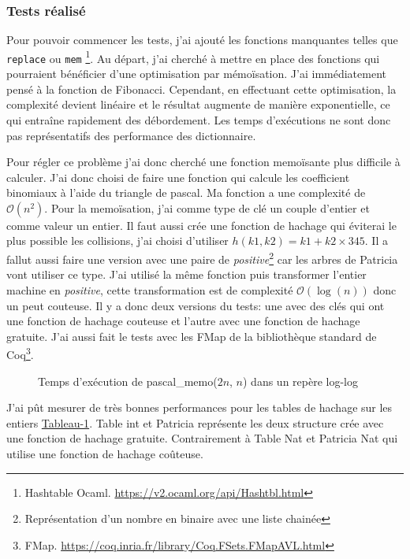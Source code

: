 \documentclass{article}
\begin{document}
      \subsubsection{Tests réalisé}

  Pour pouvoir commencer les tests, j'ai ajouté les fonctions manquantes
telles que \texttt{replace} ou \texttt{mem} \footnote{Hashtable Ocaml.
\url{https://v2.ocaml.org/api/Hashtbl.html}}.
Au départ, j'ai cherché à mettre en place des fonctions qui pourraient
bénéficier d'une optimisation par mémoïsation. J'ai immédiatement pensé à la
fonction de Fibonacci. Cependant, en effectuant cette optimisation, la
complexité devient linéaire et le résultat augmente de manière exponentielle,
ce qui entraîne rapidement des débordement. Les temps d'exécutions ne sont donc
pas représentatifs des performance des dictionnaire.

  Pour régler ce problème j'ai donc cherché une fonction memoïsante plus
difficile à calculer. J'ai donc choisi de faire une fonction qui calcule
les coefficient binomiaux à l'aide du triangle de pascal. Ma fonction a
une complexité de $\mathcal{O}(n^2)$. Pour la memoïsation, j'ai comme type
de clé un couple d'entier et comme valeur un entier. Il faut aussi crée une
fonction de hachage qui éviterai le plus possible les collisions, j'ai
choisi d'utiliser $h(k1, k2)= k1 + k2 \times 345$. Il a fallut aussi faire une
version avec une paire de \textit{positive}\footnote{Représentation d'un nombre
en binaire avec une liste chainée} car les arbres de Patricia vont utiliser ce
type. J'ai utilisé la même fonction puis transformer l'entier
machine en \textit{positive}, cette transformation est de complexité
$\mathcal{O}(\log(n))$ donc un peut couteuse. Il y a donc deux versions du
tests: une avec des clés qui ont une fonction de hachage couteuse et l'autre
avec une fonction de hachage gratuite. J'ai aussi fait le tests avec les
FMap de la bibliothèque standard de Coq\footnote{FMap.
\url{https://coq.inria.fr/library/Coq.FSets.FMapAVL.html}}.

\begin{figure}[ht]
  \centering
  
  \caption{Temps d'exécution de pascal\_memo($2n$, $n$) dans un repère log-log}
  \label{fig:pascal}
\end{figure}

J'ai pût mesurer de très bonnes performances pour les tables de hachage
sur les entiers \hyperref[fig:pascal]{Tableau-1}. Table int et Patricia
représente les deux structure crée avec une fonction de hachage gratuite.
Contrairement à Table Nat et Patricia Nat qui utilise une fonction de hachage
coûteuse.
\end{document}
